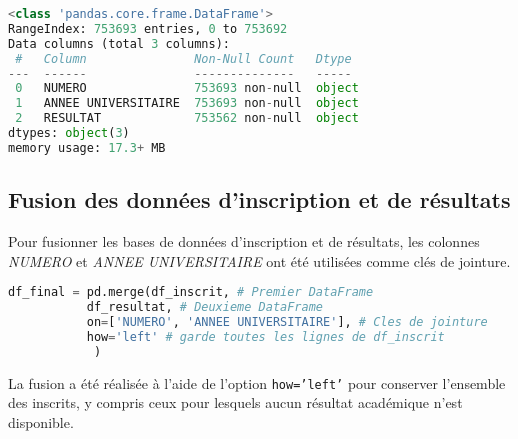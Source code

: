 \begin{lstlisting}[language=Python,
    caption=Info global du data des résultats, 
    label=lst:resultat_ucad, 
    basicstyle=\ttfamily\footnotesize, 
    backgroundcolor=\color{gray!10}
]
<class 'pandas.core.frame.DataFrame'>
RangeIndex: 753693 entries, 0 to 753692
Data columns (total 3 columns):
 #   Column               Non-Null Count   Dtype 
---  ------               --------------   ----- 
 0   NUMERO               753693 non-null  object
 1   ANNEE UNIVERSITAIRE  753693 non-null  object
 2   RESULTAT             753562 non-null  object
dtypes: object(3)
memory usage: 17.3+ MB
\end{lstlisting}

\newpage
\subsection{Fusion des données d’inscription et de résultats}

Pour fusionner les bases de données d’inscription et de résultats, 
les colonnes \textit{NUMERO} et \textit{ANNEE UNIVERSITAIRE} ont été utilisées comme clés de jointure. 

\begin{lstlisting}[language=Python,
    caption=Jointure des données d’inscription et de résultats,
    label=lst:jointure_ucad,
    basicstyle=\ttfamily\small,
    backgroundcolor=\color{gray!10}
]
df_final = pd.merge(df_inscrit, # Premier DataFrame
           df_resultat, # Deuxieme DataFrame
           on=['NUMERO', 'ANNEE UNIVERSITAIRE'], # Cles de jointure
           how='left' # garde toutes les lignes de df_inscrit
            ) 
\end{lstlisting}

La fusion a été réalisée à l’aide de l’option \texttt{how='left'} pour conserver l’ensemble des inscrits, 
y compris ceux pour lesquels aucun résultat académique n’est disponible.

